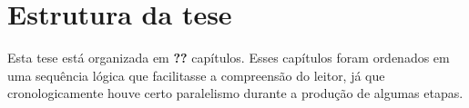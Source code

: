 \section{Estrutura da tese}
\label{Introducao:Estrutura}


Esta tese está organizada em \textbf{??} capítulos. Esses capítulos foram ordenados em uma sequência lógica que facilitasse a compreensão do leitor, já que cronologicamente houve certo paralelismo durante a produção de algumas etapas.

